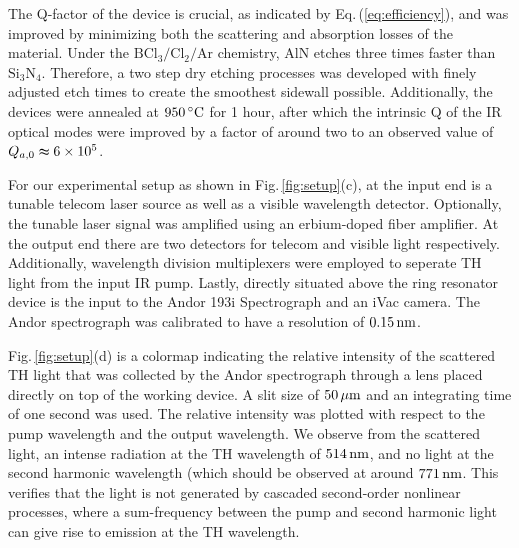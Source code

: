 \documentclass[9pt,twocolumn,twoside]{optica}
\begin{document}
The Q-factor of the device is crucial, as indicated by Eq.$\,$(\ref{eq:efficiency}), and was improved by minimizing both the scattering and absorption losses of the material. Under the $\mathrm{BCl_{3}/Cl_{2}/Ar}$ chemistry, AlN etches three times faster than $\mathrm{Si_{3}N_{4}}$. Therefore, a two step dry etching processes was developed with finely adjusted etch times to create the smoothest sidewall possible. Additionally, the devices were annealed at $\mathrm{950}\thinspace^{\mathrm{\circ}}\mathrm{C}$ for 1 hour, after which the intrinsic Q of the IR optical modes were improved by a factor of around two to an observed value of $Q_{a,0}\thickapprox6\times10^{5}$. 

For our experimental setup as shown in Fig.$\,$\ref{fig:setup}(c), at the input end is a tunable telecom laser source as well as a visible wavelength detector. Optionally, the tunable laser signal was amplified using an erbium-doped fiber amplifier. At the output end there are two detectors for telecom and visible light respectively. Additionally, wavelength division multiplexers were employed to seperate TH light from the input IR pump. Lastly, directly situated above the ring resonator device is the input to the Andor 193i Spectrograph and an iVac camera. The Andor spectrograph was calibrated to have a resolution of $\mathrm{0.15\thinspace nm}$.

Fig.$\,$\ref{fig:setup}(d) is a colormap indicating the relative intensity of the scattered TH light that was collected by the Andor spectrograph through a lens placed directly on top of the working device. A slit size of $50\thinspace\mu \mathrm{m}$ and an integrating time of one second was used. The relative intensity was plotted with respect to the pump wavelength and the output wavelength. We observe from the scattered light, an intense radiation at the TH wavelength of $\mathrm{514\thinspace nm}$, and no light at the second harmonic wavelength (which should be observed at around $771\thinspace\mathrm{nm}$. This verifies that the light is not generated by cascaded second-order nonlinear processes, where a sum-frequency between the pump and second harmonic light can give rise to emission at the TH wavelength.
 
\end{document}
